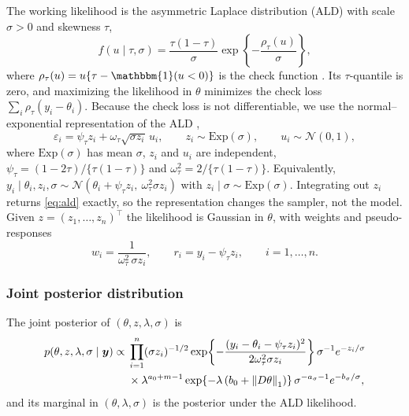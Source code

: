 The working likelihood is the asymmetric Laplace distribution (ALD) with scale $\sigma > 0$ and skewness $\tau$,
\begin{equation}
    f(u \mid \tau, \sigma) = \frac{\tau(1-\tau)}{\sigma}
    \exp\!\left\{-\frac{\rho_\tau(u)}{\sigma}\right\},
    \label{eq:ald}
\end{equation}
where $\rho_\tau(u) = u\{\tau - \mathbbm{1}(u < 0)\}$ is the check function \citep{koenker1978regression}. Its $\tau$-quantile is zero, and maximizing the likelihood in $\theta$ minimizes the check loss $\sum_i \rho_\tau(y_i-\theta_i)$. Because the check loss is not differentiable, we use the normal--exponential representation of the ALD \citep{kozumi2011gibbs},
\begin{equation}
    \varepsilon_i = \psi_\tau z_i + \omega_\tau \sqrt{\sigma z_i}\, u_i, \qquad z_i \sim \mathrm{Exp}(\sigma), \qquad u_i \sim \mathcal{N}(0,1),
    \label{eq:ald_mixture}
\end{equation}
where $\mathrm{Exp}(\sigma)$ has mean $\sigma$, $z_i$ and $u_i$ are independent, $\psi_\tau = (1-2\tau)/\{\tau(1-\tau)\}$ and $\omega_\tau^2 = 2/\{\tau(1-\tau)\}$. Equivalently, $y_i \mid \theta_i, z_i, \sigma \sim \mathcal{N}(\theta_i + \psi_\tau z_i,\ \omega_\tau^2 \sigma z_i)$ with $z_i \mid \sigma \sim \mathrm{Exp}(\sigma)$. Integrating out $z_i$ returns \eqref{eq:ald} exactly, so the representation changes the sampler, not the model. Given $z = (z_1,\ldots,z_n)^\top$ the likelihood is Gaussian in $\theta$, with weights and pseudo-responses
\begin{equation}
    w_i = \frac{1}{\omega_\tau^2\, \sigma z_i}, \qquad r_i = y_i - \psi_\tau z_i, \qquad i = 1,\ldots,n.
    \label{eq:weights}
\end{equation}

\subsubsection{Joint posterior distribution}

The joint posterior of $(\theta, z, \lambda, \sigma)$ is
\begin{equation}
\begin{aligned}
    p(\theta, z, \lambda, \sigma \mid \bm{y}) \propto{} & \prod_{i=1}^n (\sigma z_i)^{-1/2} \exp\!\left\{-\frac{(y_i-\theta_i-\psi_\tau z_i)^2}{2\omega_\tau^2 \sigma z_i}\right\} \sigma^{-1} e^{-z_i/\sigma} \\
    & \times \lambda^{a_0 + m - 1} \exp\!\left\{-\lambda\left(b_0 + \left\lVert D\theta\right\rVert_1\right)\right\} \sigma^{-a_\sigma - 1} e^{-b_\sigma/\sigma},
\end{aligned}
    \label{eq:posterior}
\end{equation}
and its marginal in $(\theta, \lambda, \sigma)$ is the posterior under the ALD likelihood.

